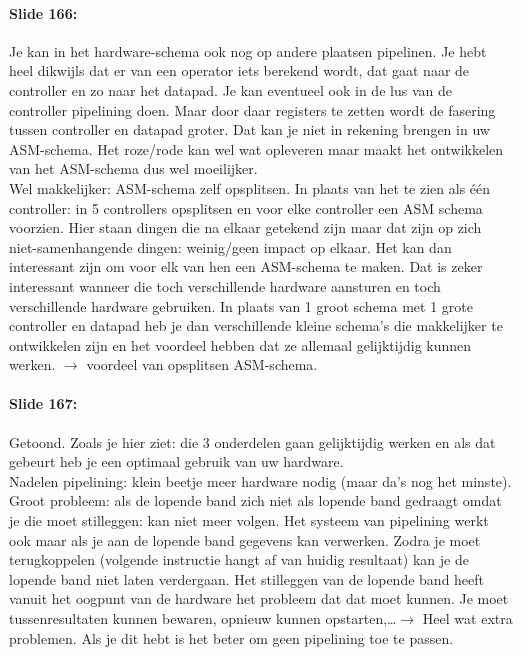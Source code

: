 \documentclass[10pt,a4paper]{book}
\begin{document}
\paragraph{Slide 166:} Je kan in het hardware-schema ook nog op andere plaatsen pipelinen. Je hebt heel dikwijls dat er van een operator iets berekend wordt, dat gaat naar de controller en zo naar het datapad. Je kan eventueel ook in de lus van de controller pipelining doen. Maar door daar registers te zetten wordt de fasering tussen controller en datapad groter. Dat kan je niet in rekening brengen in uw ASM-schema. Het roze/rode kan wel wat opleveren maar maakt het ontwikkelen van het ASM-schema dus wel moeilijker.\\
Wel makkelijker: ASM-schema zelf opsplitsen. In plaats van het te zien als \'e\'en controller: in 5 controllers opsplitsen en voor elke controller een ASM schema voorzien. Hier staan dingen die na elkaar getekend zijn maar dat zijn op zich niet-samenhangende dingen: weinig/geen impact op elkaar. Het kan dan interessant zijn om voor elk van hen een ASM-schema te maken. Dat is zeker interessant wanneer die toch verschillende hardware aansturen en toch verschillende hardware gebruiken. In plaats van 1 groot schema met 1 grote controller en datapad heb je dan verschillende kleine schema's die makkelijker te ontwikkelen zijn en het voordeel hebben dat ze allemaal gelijktijdig kunnen werken. $\rightarrow$ voordeel van opsplitsen ASM-schema.

\paragraph{Slide 167:} Getoond. Zoals je hier ziet: die 3 onderdelen gaan gelijktijdig werken en als dat gebeurt heb je een optimaal gebruik van uw hardware.\\
Nadelen pipelining: klein beetje meer hardware nodig (maar da's nog het minste). Groot probleem: als de lopende band zich niet als lopende band gedraagt omdat je die moet stilleggen: kan niet meer volgen. Het systeem van pipelining werkt ook maar als je aan de lopende band gegevens kan verwerken. Zodra je moet terugkoppelen (volgende instructie hangt af van huidig resultaat) kan je de lopende band niet laten verdergaan. Het stilleggen van de lopende band heeft vanuit het oogpunt van de hardware het probleem dat dat moet kunnen. Je moet tussenresultaten kunnen bewaren, opnieuw kunnen opstarten,\ldots $\rightarrow$ Heel wat extra problemen. Als je dit hebt is het beter om geen pipelining toe te passen. 
\end{document}
